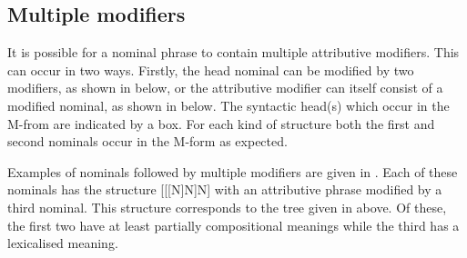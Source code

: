 \subsection{Multiple modifiers}\label{sec:MulMod}
It is possible for a nominal phrase to contain multiple attributive modifiers.
This can occur in two ways.
Firstly, the head nominal can be modified by two modifiers, as shown in  below,
or the attributive modifier can itself consist of a modified nominal, as shown in  below.
The syntactic head(s) which occur in the M-from are indicated by a box.
For each kind of structure both the first and second nominals occur in the M-form as expected.

\begin{multicols}{2}
	\begin{exe}
		\label{tr:MulMod}
		\label{tr:ModModN}
	\end{exe}
\end{multicols}

Examples of nominals followed by multiple modifiers
are given in .
Each of these nominals has the structure [[[N]N]N]
with an attributive phrase modified by a third nominal.
This structure corresponds to the tree given in  above.
Of these, the first two have at least partially compositional meanings
while the third has a lexicalised meaning.

